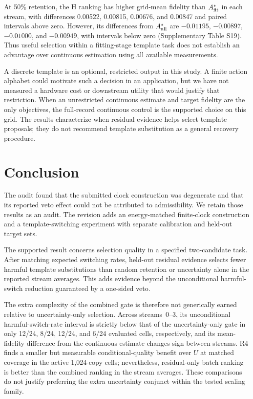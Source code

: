 \documentclass{iopjournal}
\begin{document}
At 50\% retention, the H ranking has higher grid-mean fidelity than
$A^*_{\rm fit}$ in each stream, with differences 0.00522, 0.00815, 0.00676,
and 0.00847 and paired intervals above zero.  However, its differences from
$A^*_{\rm all}$ are $-0.01195$, $-0.00897$, $-0.01000$, and $-0.00949$,
with intervals below zero (Supplementary Table S19).
Thus useful selection within a fitting-stage template task does not establish
an advantage over continuous estimation using all available measurements.

A discrete template is an optional, restricted output in this study.
A finite action alphabet could motivate such a decision in an application,
but we have not measured a hardware cost or downstream utility that would
justify that restriction.  When an unrestricted continuous estimate and
target fidelity are the only objectives, the full-record continuous control
is the supported choice on this grid.  The results characterize when residual
evidence helps select template proposals; they do not recommend template
substitution as a general recovery procedure.

\section{Conclusion}\label{sec:conclusion}

The audit found that the submitted clock construction was degenerate and that
its reported veto effect could not be attributed to admissibility.  We retain
those results as an audit.  The revision adds an energy-matched finite-clock
construction and a template-switching experiment with separate calibration and
held-out target sets.

The supported result concerns selection quality in a specified two-candidate
task.  After matching expected switching rates, held-out residual evidence
selects fewer harmful template substitutions than random retention or
uncertainty alone in the reported stream averages.  This adds evidence beyond
the unconditional harmful-switch reduction guaranteed by a one-sided veto.

The extra complexity of the combined gate is therefore not generically earned
relative to uncertainty-only selection.  Across streams~0--3, its
unconditional harmful-switch-rate interval is strictly below that of the
uncertainty-only gate in only
12/24, 8/24, 12/24, and 6/24 evaluated cells, respectively, and its
mean-fidelity difference from the continuous estimate changes sign between
streams.  R4 finds a smaller but measurable conditional-quality benefit over
$U$ at matched coverage in the active 1,024-copy cells; nevertheless,
residual-only batch ranking is better than the combined ranking in the stream
averages.  These comparisons do not justify preferring the extra uncertainty
conjunct within the tested scaling family.
\end{document}
